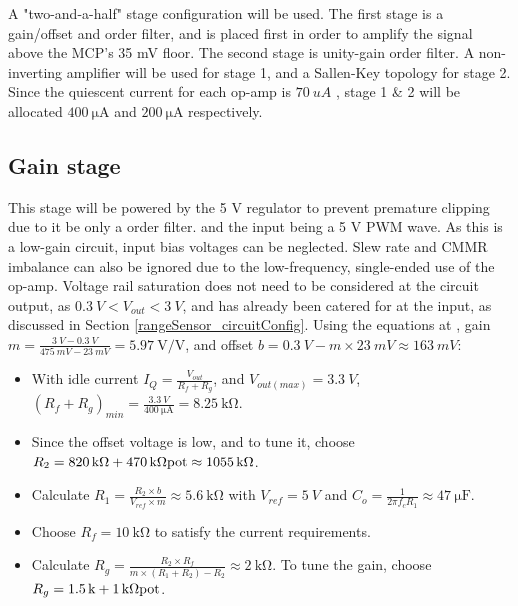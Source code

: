 A "two-and-a-half" stage configuration will be used. The first stage is a gain/offset and  order filter,
and is placed first in order to amplify the signal above the MCP's 35 mV floor. The second stage is unity-gain  order filter.
A non-inverting amplifier will be used for stage 1, and a Sallen-Key topology for stage 2. Since the quiescent current for each op-amp is
$\SI{70}{uA}$ \cite{datasheetMCP6242}, stage 1 \& 2 will be allocated $\SI{400}{\micro\ampere}$ and $\SI{200}{\micro\ampere}$ respectively.

\subsection{Gain stage}

This stage will be powered by the 5 V regulator to prevent premature clipping due to it be only a  order filter.
and the input being a 5 V PWM wave. As this is a low-gain circuit, input bias voltages can be neglected.
Slew rate and CMMR imbalance can also be ignored due to the low-frequency, single-ended use of the op-amp.
Voltage rail saturation does not need to be considered at the circuit output, as $\SI{0.3}{V} < V_{out} < \SI{3}{V}$,
and has already been catered for at the input, as discussed in Section \ref{rangeSensor_circuitConfig}.
Using the equations at \cite{gainOffset30Seconds}, gain $m = \frac{\SI{3}{V} - \SI{0.3}{V}}{\SI{475}{mV} - \SI{23}{mV}} = \SI{5.97}{\volt\per\volt}$,
and offset $b = \SI{0.3}{V} - m \times \SI{23}{mV} \approx \SI{163}{mV}$:

\begin{itemize}
  \item With idle current $I_Q = \frac{V_{out}}{R_f + R_g}$, and $V_{out(max)} = \SI{3.3}{V}$, $(R_f + R_g)_{min} = \frac{\SI{3.3}{V}}{\SI{400}{\micro\ampere}} = \SI{8.25}{\kilo\ohm}$.
  \item Since the offset voltage is low, and to tune it, choose $R_2 = \SI{820}{\kilo\ohm} + \SI{470}{\kilo\ohm} \textnormal{pot} \approx \SI{1055}{\kilo\ohm}$.
  \item Calculate $R_1 = \frac{R_2 \times b}{V_{ref} \times m} \approx \SI{5.6}{\kilo\ohm}$ with $V_{ref} = \SI{5}{V}$ and $C_o = \frac{1}{2 \pi f_c R_1} \approx \SI{47}{\micro\farad}$.
  \item Choose $R_f = \SI{10}{\kilo\ohm}$ to satisfy the current requirements.
  \item Calculate $R_g = \frac{R_2 \times R_f}{m \times (R_1 + R_2) - R_2} \approx \SI{2}{\kilo\ohm}$. To tune the gain, choose $R_g = \SI{1.5}{k} + \SI{1}{\kilo\ohm}\textnormal{pot}$.
\end{itemize}


